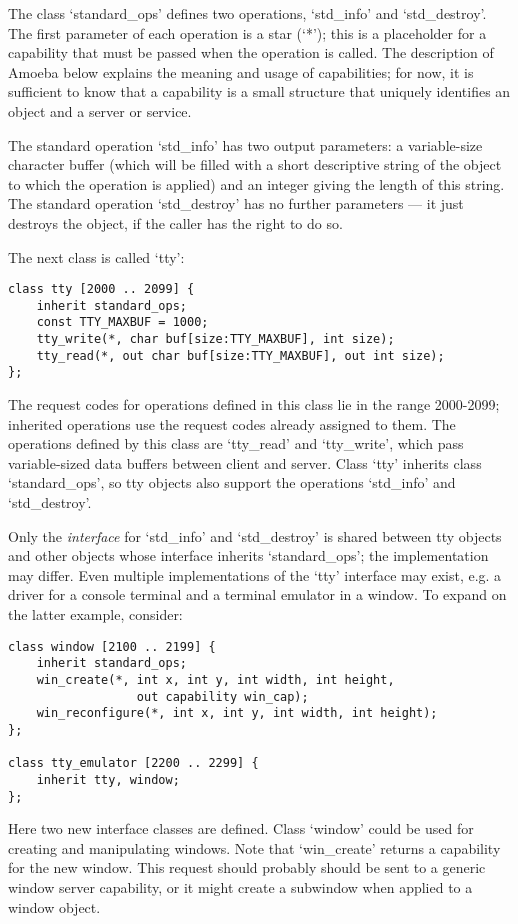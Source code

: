 The class `standard\_ops' defines two operations, `std\_info' and
`std\_destroy'.  The first parameter of each operation is a star
(`*'); this is a placeholder for a capability that must be passed when
the operation is called.  The description of Amoeba below explains the
meaning and usage of capabilities; for now, it is sufficient to know
that a capability is a small structure that uniquely identifies an
object and a server or service.

The standard operation `std\_info' has two output parameters: a
variable-size character buffer (which will be filled with a short
descriptive string of the object to which the operation is applied)
and an integer giving the length of this string.  The standard
operation `std\_destroy' has no further parameters --- it just
destroys the object, if the caller has the right to do so.

The next class is called `tty':
\begin{verbatim}
class tty [2000 .. 2099] {
    inherit standard_ops;
    const TTY_MAXBUF = 1000;
    tty_write(*, char buf[size:TTY_MAXBUF], int size);
    tty_read(*, out char buf[size:TTY_MAXBUF], out int size);
};
\end{verbatim}
The request codes for operations defined in this class lie in the
range 2000-2099; inherited operations use the request codes already
assigned to them.  The operations defined by this class are
`tty\_read' and `tty\_write', which pass variable-sized data buffers
between client and server.  Class `tty' inherits class
`standard\_ops', so tty objects also support the operations
`std\_info' and `std\_destroy'.

Only the {\em interface} for `std\_info' and `std\_destroy' is shared
between tty objects and other objects whose interface inherits
`standard\_ops'; the implementation may differ.  Even multiple
implementations of the `tty' interface may exist, e.g. a driver for a
console terminal and a terminal emulator in a window.  To expand on
the latter example, consider:
\begin{verbatim}
class window [2100 .. 2199] {
    inherit standard_ops;
    win_create(*, int x, int y, int width, int height,
                  out capability win_cap);
    win_reconfigure(*, int x, int y, int width, int height);
};

class tty_emulator [2200 .. 2299] {
    inherit tty, window;
};
\end{verbatim}
Here two new interface classes are defined.
Class `window' could be used for creating and manipulating windows.
Note that `win\_create' returns a capability for the new window.
This request should probably should be sent to a generic window
server capability, or it might create a subwindow when applied to a
window object.

